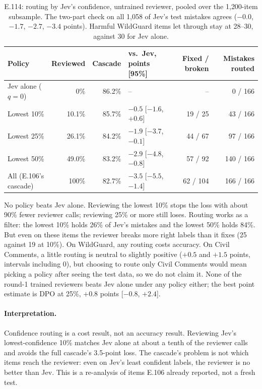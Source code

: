 \documentclass[11pt]{article}
\renewcommand{\_}{\origunderscore\allowbreak}
\begin{document}
\begin{table}[H]
\centering
\small
\begin{tabularx}{\textwidth}{@{}Xrrlrr@{}}
\toprule
Policy & Reviewed & Cascade & vs.\ Jev, points [95\%] & Fixed / broken & Mistakes routed \\
\midrule
Jev alone ($q = 0$) & 0\% & 86.2\% & -- & -- & 0 / 166 \\
Lowest 10\% & 10.1\% & 85.7\% & $-0.5$ [$-1.6$, $+0.6$] & 19 / 25 & 43 / 166 \\
Lowest 25\% & 26.1\% & 84.2\% & $-1.9$ [$-3.7$, $-0.1$] & 44 / 67 & 97 / 166 \\
Lowest 50\% & 49.0\% & 83.2\% & $-2.9$ [$-4.8$, $-0.8$] & 57 / 92 & 140 / 166 \\
All (E.106's cascade) & 100\% & 82.7\% & $-3.5$ [$-5.5$, $-1.4$] & 62 / 104 & 166 / 166 \\
\bottomrule
\end{tabularx}
\caption{E.114: routing by Jev's confidence, untrained reviewer, pooled over the 1{,}200-item subsample. The two-part check on all 1{,}058 of Jev's test mistakes agrees ($-0.0$, $-1.7$, $-2.7$, $-3.4$ points). Harmful WildGuard items let through stay at 28--30, against 30 for Jev alone.}
\label{tab:e114}
\end{table}

No policy beats Jev alone. Reviewing the lowest 10\% stops the loss with about 90\% fewer reviewer calls; reviewing 25\% or more still loses. Routing works as a filter: the lowest 10\% holds 26\% of Jev's mistakes and the lowest 50\% holds 84\%. But even on these items the reviewer breaks more right labels than it fixes (25 against 19 at 10\%). On WildGuard, any routing costs accuracy. On Civil Comments, a little routing is neutral to slightly positive ($+0.5$ and $+1.5$ points, intervals including 0), but choosing to route only Civil Comments would mean picking a policy after seeing the test data, so we do not claim it. None of the round-1 trained reviewers beats Jev alone under any policy either; the best point estimate is DPO at 25\%, $+0.8$ points [$-0.8$, $+2.4$].

\paragraph{Interpretation.}
Confidence routing is a cost result, not an accuracy result. Reviewing Jev's lowest-confidence 10\% matches Jev alone at about a tenth of the reviewer calls and avoids the full cascade's 3.5-point loss. The cascade's problem is not which items reach the reviewer: even on Jev's least confident labels, the reviewer is no better than Jev. This is a re-analysis of items E.106 already reported, not a fresh test.
\end{document}
